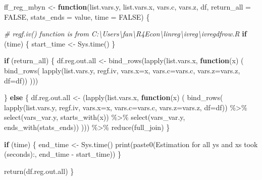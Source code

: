 \documentclass[
]{book}
\newenvironment{Shaded}{\begin{snugshade}}{\end{snugshade}}
\newcommand{\AttributeTok}[1]{\textcolor[rgb]{0.77,0.63,0.00}{#1}}
\newcommand{\CommentTok}[1]{\textcolor[rgb]{0.56,0.35,0.01}{\textit{#1}}}
\newcommand{\ConstantTok}[1]{\textcolor[rgb]{0.00,0.00,0.00}{#1}}
\newcommand{\ControlFlowTok}[1]{\textcolor[rgb]{0.13,0.29,0.53}{\textbf{#1}}}
\newcommand{\FunctionTok}[1]{\textcolor[rgb]{0.00,0.00,0.00}{#1}}
\newcommand{\NormalTok}[1]{#1}
\newcommand{\OtherTok}[1]{\textcolor[rgb]{0.56,0.35,0.01}{#1}}
\newcommand{\SpecialCharTok}[1]{\textcolor[rgb]{0.00,0.00,0.00}{#1}}
\newcommand{\StringTok}[1]{\textcolor[rgb]{0.31,0.60,0.02}{#1}}
\begin{document}
\begin{Shaded}
\begin{Highlighting}[]
\NormalTok{ff\_reg\_mbyn }\OtherTok{\textless{}{-}} \ControlFlowTok{function}\NormalTok{(list.vars.y, list.vars.x,}
\NormalTok{                        vars.c, vars.z, df,}
                        \AttributeTok{return\_all =} \ConstantTok{FALSE}\NormalTok{,}
                        \AttributeTok{stats\_ends =} \StringTok{\textquotesingle{}value\textquotesingle{}}\NormalTok{, }\AttributeTok{time =} \ConstantTok{FALSE}\NormalTok{) \{}

  \CommentTok{\# regf.iv() function is from C:\textbackslash{}Users\textbackslash{}fan\textbackslash{}R4Econ\textbackslash{}linreg\textbackslash{}ivreg\textbackslash{}ivregdfrow.R}
  \ControlFlowTok{if}\NormalTok{ (time) \{}
\NormalTok{    start\_time }\OtherTok{\textless{}{-}} \FunctionTok{Sys.time}\NormalTok{()}
\NormalTok{  \}}

  \ControlFlowTok{if}\NormalTok{ (return\_all) \{}
\NormalTok{    df.reg.out.all }\OtherTok{\textless{}{-}}
      \FunctionTok{bind\_rows}\NormalTok{(}\FunctionTok{lapply}\NormalTok{(list.vars.x,}
                       \ControlFlowTok{function}\NormalTok{(x) (}
                         \FunctionTok{bind\_rows}\NormalTok{(}
                           \FunctionTok{lapply}\NormalTok{(list.vars.y, regf.iv,}
                                  \AttributeTok{vars.x=}\NormalTok{x, }\AttributeTok{vars.c=}\NormalTok{vars.c, }\AttributeTok{vars.z=}\NormalTok{vars.z, }\AttributeTok{df=}\NormalTok{df))}
\NormalTok{                       )))}

\NormalTok{  \} }\ControlFlowTok{else}\NormalTok{ \{}
\NormalTok{    df.reg.out.all }\OtherTok{\textless{}{-}}
\NormalTok{      (}\FunctionTok{lapply}\NormalTok{(list.vars.x,}
              \ControlFlowTok{function}\NormalTok{(x) (}
                \FunctionTok{bind\_rows}\NormalTok{(}
                  \FunctionTok{lapply}\NormalTok{(list.vars.y, regf.iv,}
                         \AttributeTok{vars.x=}\NormalTok{x, }\AttributeTok{vars.c=}\NormalTok{vars.c, }\AttributeTok{vars.z=}\NormalTok{vars.z, }\AttributeTok{df=}\NormalTok{df)) }\SpecialCharTok{\%\textgreater{}\%}
                  \FunctionTok{select}\NormalTok{(vars\_var.y, }\FunctionTok{starts\_with}\NormalTok{(x)) }\SpecialCharTok{\%\textgreater{}\%}
                  \FunctionTok{select}\NormalTok{(vars\_var.y, }\FunctionTok{ends\_with}\NormalTok{(stats\_ends))}
\NormalTok{              ))) }\SpecialCharTok{\%\textgreater{}\%} \FunctionTok{reduce}\NormalTok{(full\_join)}
\NormalTok{  \}}

  \ControlFlowTok{if}\NormalTok{ (time) \{}
\NormalTok{    end\_time }\OtherTok{\textless{}{-}} \FunctionTok{Sys.time}\NormalTok{()}
    \FunctionTok{print}\NormalTok{(}\FunctionTok{paste0}\NormalTok{(}\StringTok{\textquotesingle{}Estimation for all ys and xs took (seconds):\textquotesingle{}}\NormalTok{,}
\NormalTok{                 end\_time }\SpecialCharTok{{-}}\NormalTok{ start\_time))}
\NormalTok{  \}}

  \FunctionTok{return}\NormalTok{(df.reg.out.all)}
\NormalTok{\}}
\end{Highlighting}
\end{Shaded}
\end{document}
